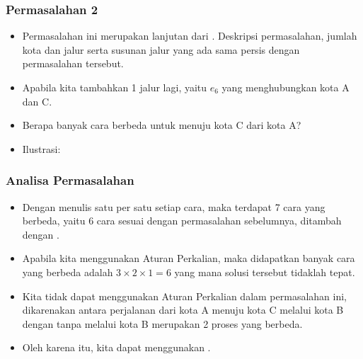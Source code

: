 \begin{frame}
\frametitle{Permasalahan 2}
\begin{itemize}
  \item Permasalahan ini merupakan lanjutan dari . Deskripsi permasalahan, jumlah kota dan jalur serta susunan jalur yang ada sama persis dengan permasalahan tersebut.
  \item Apabila kita tambahkan 1 jalur lagi, yaitu $e_{6}$ yang menghubungkan kota A dan C.
  \item Berapa banyak cara berbeda untuk menuju kota C dari kota A?
  \item Ilustrasi:
  \newline
\end{itemize}
\end{frame}

\begin{frame}
\frametitle{Analisa Permasalahan}
\begin{itemize}
  \item Dengan menulis satu per satu setiap cara, maka terdapat 7 cara yang berbeda, yaitu 6 cara sesuai dengan permasalahan sebelumnya, ditambah dengan .
  \item Apabila kita menggunakan Aturan Perkalian, maka didapatkan banyak cara yang berbeda adalah $3 \times 2 \times 1 = 6$ yang mana solusi tersebut tidaklah tepat.
  \item Kita tidak dapat menggunakan Aturan Perkalian dalam permasalahan ini, dikarenakan antara perjalanan dari kota A menuju kota C melalui kota B dengan tanpa melalui kota B merupakan 2 proses yang berbeda.
  \item Oleh karena itu, kita dapat menggunakan .
\end{itemize}
\end{frame}

